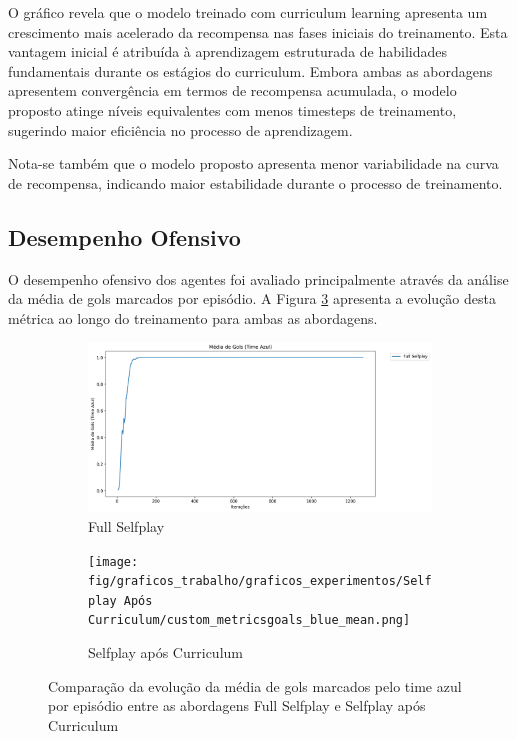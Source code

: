 O gráfico revela que o modelo treinado com curriculum learning apresenta um crescimento mais acelerado da recompensa nas fases iniciais do treinamento. Esta vantagem inicial é atribuída à aprendizagem estruturada de habilidades fundamentais durante os estágios do curriculum. Embora ambas as abordagens apresentem convergência em termos de recompensa acumulada, o modelo proposto atinge níveis equivalentes com menos timesteps de treinamento, sugerindo maior eficiência no processo de aprendizagem.

Nota-se também que o modelo proposto apresenta menor variabilidade na curva de recompensa, indicando maior estabilidade durante o processo de treinamento.

\subsection{Desempenho Ofensivo}

O desempenho ofensivo dos agentes foi avaliado principalmente através da análise da média de gols marcados por episódio. A Figura \ref{fig:goals_blue_comparison} apresenta a evolução desta métrica ao longo do treinamento para ambas as abordagens.

\begin{figure}[H]
    \centering
    \begin{subfigure}[b]{0.49\textwidth}
        \centering
        \includegraphics[width=\textwidth]{fig/graficos_trabalho/graficos_experimentos/Full Selfplay/custom_metricsgoals_blue_mean.png}
        \caption{Full Selfplay}
        \label{fig:goals_full_selfplay}
    \end{subfigure}
    \hfill
    \begin{subfigure}[b]{0.49\textwidth}
        \centering
        \texttt{[image: fig/graficos\_trabalho/graficos\_experimentos/Selfplay Após Curriculum/custom\_metricsgoals\_blue\_mean.png]}
        \caption{Selfplay após Curriculum}
        \label{fig:goals_selfplay_curriculum}
    \end{subfigure}
    \caption{Comparação da evolução da média de gols marcados pelo time azul por episódio entre as abordagens Full Selfplay e Selfplay após Curriculum}
    \label{fig:goals_blue_comparison}
\end{figure}

